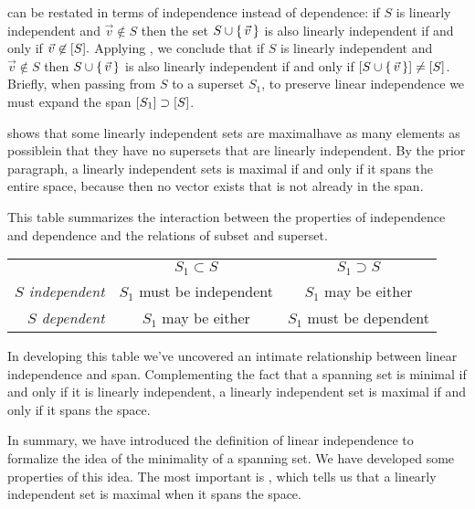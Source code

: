  can be restated
in terms of independence instead of dependence:
if \( S \) is linearly independent and \( \vec{v}\not\in S \) then
the set \( S\cup\mbox{$\{\,\vec{v}\,\}$} \)
is also linearly independent if and only if \( \vec{v}\not\in\relax [S\relax ]. \)
Applying ,
we conclude that
if \( S \) is linearly independent and \( \vec{v}\not\in S \)
then \( S\cup\mbox{$\{\,\vec{v}\,\}$} \) is also
linearly independent if and only if
\( \relax [S\cup\mbox{$\{\,\vec{v}\,\}$}\relax ]\neq\relax [S\relax ] \).
Briefly,
when passing from $S$ to a superset $S_1$,
to preserve linear independence we must expand the span
$\relax [S_1\relax ]\supset\relax [S\relax ]$.

 shows that some 
linearly independent sets are maximal\Dash have as many elements as 
possible\Dash in
that they have no supersets that are linearly independent.
By the prior paragraph, 
a linearly independent sets is maximal if and only if it
spans the 
entire space, because then no vector exists that is not already in the span.

This table summarizes the interaction between the properties of independence
and dependence and the relations of subset and superset.
\medskip
\begin{center} \renewcommand{\arraystretch}{1.1}
  \begin{tabular}[b]{r|cc} 
                        \multicolumn{1}{c}{}
                        &\multicolumn{1}{c}{\( S_1\subset S \)}
                        &\multicolumn{1}{c}{\( S_1\supset S \)}      \\
     \cline{2-3}\rule{0em}{12pt} %
          \textit{$S$ independent} 
              &\( S_1 \) must be independent   &\( S_1 \) may be either\\
          \textit{$S$ dependent} 
              &\( S_1 \) may be either &\( S_1 \) must be dependent    \\
   \end{tabular}
\end{center}
\medskip
In developing this table we've uncovered an
intimate relationship between linear independence and span.
Complementing the fact that
a spanning set is minimal if and only if it is linearly independent,
a linearly independent set is maximal if and only if it spans the space.

In summary,
we have introduced the definition of linear independence to 
formalize the idea of the minimality of a spanning set.
We have developed some properties of this idea.
The most important is , which 
tells us that a linearly independent set is maximal when it spans the space.


